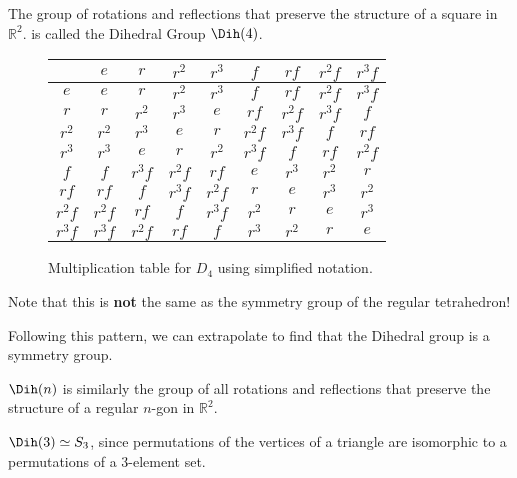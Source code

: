  \begin{example}
    The group of rotations and reflections that preserve the structure of a square in $\mathbb{R}^2$. is called the Dihedral Group $\Dih(4)$. 

    \begin{figure}[H]
      \centering 
      \begin{tabular}{|c|c|c|c|c|c|c|c|c|}
        \hline
        & $e$ & $r$ & $r^2$ & $r^3$ & $f$ & $rf$ & $r^2f$ & $r^3f$ \\
        \hline
        $e$ & $e$ & $r$ & $r^2$ & $r^3$ & $f$ & $rf$ & $r^2f$ & $r^3f$ \\
        \hline
        $r$ & $r$ & $r^2$ & $r^3$ & $e$ & $rf$ & $r^2f$ & $r^3f$ & $f$ \\
        \hline
        $r^2$ & $r^2$ & $r^3$ & $e$ & $r$ & $r^2f$ & $r^3f$ & $f$ & $rf$ \\
        \hline
        $r^3$ & $r^3$ & $e$ & $r$ & $r^2$ & $r^3f$ & $f$ & $rf$ & $r^2f$ \\
        \hline
        $f$ & $f$ & $r^3f$ & $r^2f$ & $rf$ & $e$ & $r^3$ & $r^2$ & $r$ \\
        \hline
        $rf$ & $rf$ & $f$ & $r^3f$ & $r^2f$ & $r$ & $e$ & $r^3$ & $r^2$ \\
        \hline
        $r^2f$ & $r^2f$ & $rf$ & $f$ & $r^3f$ & $r^2$ & $r$ & $e$ & $r^3$ \\
        \hline
        $r^3f$ & $r^3f$ & $r^2f$ & $rf$ & $f$ & $r^3$ & $r^2$ & $r$ & $e$ \\
        \hline
      \end{tabular}
      \caption{Multiplication table for $D_4$ using simplified notation.} 
      \label{fig:square_d4_simplified}
    \end{figure}

    Note that this is \textbf{not} the same as the symmetry group of the regular tetrahedron! 
  \end{example} 

  Following this pattern, we can extrapolate to find that the Dihedral group is a symmetry group. 

  \begin{theorem}
    $\Dih(n)$ is similarly the group of all rotations and reflections that preserve the structure of a regular $n$-gon in $\mathbb{R}^2$. 
  \end{theorem}

  \begin{example}
    $\Dih(3) \simeq S_{3}$, since permutations of the vertices of a triangle are isomorphic to a permutations of a 3-element set. 
  \end{example}  

